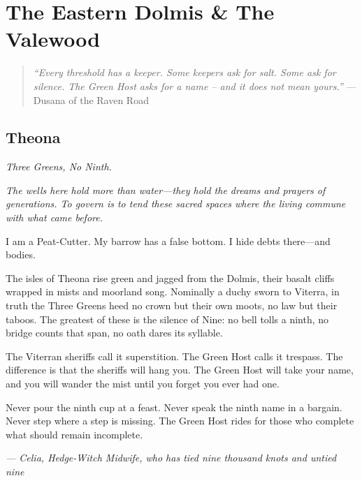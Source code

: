 \part{The Eastern Dolmis \& The Valewood}

\begin{quote}
  \small
  \textit{``Every threshold has a keeper. Some keepers ask for salt. Some ask for silence. The Green Host asks for a name -- and it does not mean yours.''}
  \noindent --- Dusana of the Raven Road
  \end{quote}
\chapter{Theona}
\emph{Three Greens, No Ninth.}

\noindent
{\Large
\textit{The wells here hold more than water---they hold the dreams and prayers of generations. To govern is to tend these sacred spaces where the living commune with what came before.}

\vspace{0.5em}

I am a Peat-Cutter. My barrow has a false bottom. I hide debts there---and bodies.

\vspace{0.5em}

The isles of Theona rise green and jagged from the Dolmis, their basalt cliffs wrapped in mists and moorland song. Nominally a duchy sworn to Viterra, in truth the Three Greens heed no crown but their own moots, no law but their taboos. The greatest of these is the silence of Nine: no bell tolls a ninth, no bridge counts that span, no oath dares its syllable.

\vspace{0.5em}

The Viterran sheriffs call it superstition. The Green Host calls it trespass. The difference is that the sheriffs will hang you. The Green Host will take your name, and you will wander the mist until you forget you ever had one.

\vspace{0.5em}

Never pour the ninth cup at a feast. Never speak the ninth name in a bargain. Never step where a step is missing. The Green Host rides for those who complete what should remain incomplete.

\vspace{1em}

\noindent\textit{--- Celia, Hedge-Witch Midwife, who has tied nine thousand knots and untied nine}
}

